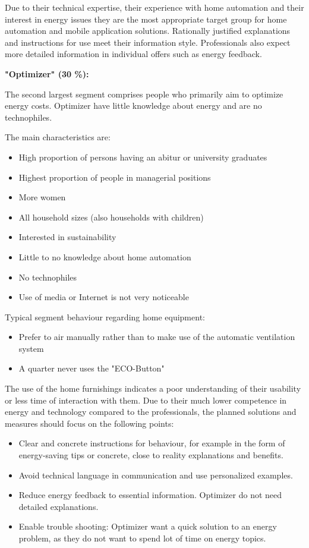 Due to their technical expertise, their experience with home automation and their interest in energy issues they are the most appropriate target group for home automation and mobile application solutions. Rationally justified explanations and instructions for use meet their information style. Professionals also expect more detailed information in individual offers such as energy feedback.

\textbf{"Optimizer" (30 \%):}

The second largest segment comprises people who primarily aim to optimize energy costs. Optimizer have little knowledge about energy and are no technophiles.

The main characteristics are:
\begin{itemize}
	\item High proportion of persons having an abitur or university graduates
	\item Highest proportion of people in managerial positions
	\item More women
	\item All household sizes (also households with children)
	\item Interested in sustainability	
	\item Little to no knowledge about home automation
	\item No technophiles
	\item Use of media or Internet is not very noticeable
\end{itemize}

Typical segment behaviour regarding home equipment:
\begin{itemize}
	\item Prefer to air manually rather than to make use of the automatic ventilation system
	\item A quarter never uses the "ECO-Button"
\end{itemize}

The use of the home furnishings indicates a poor understanding of their usability or less time of interaction with them. Due to their much lower competence in energy and technology compared to the professionals, the planned solutions and measures should focus on the following points:

\begin{itemize}
	\item Clear and concrete instructions for behaviour, for example in the form of energy-saving tips or concrete, close to reality explanations and benefits.
	\item Avoid technical language in communication and use personalized examples.
	\item Reduce energy feedback to essential information. Optimizer do not need detailed explanations. 
	\item Enable trouble shooting: Optimizer want a quick solution to an energy problem, as they do not want to spend lot of time on energy topics.
\end{itemize}

